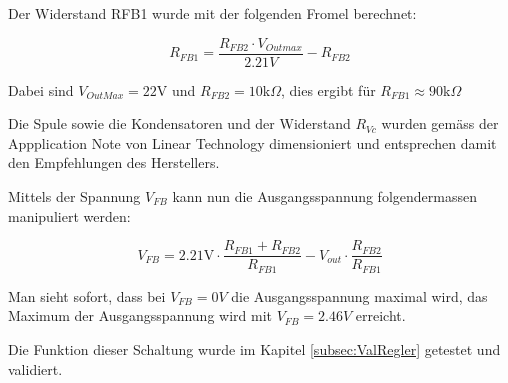 Der Widerstand RFB1 wurde mit der folgenden Fromel berechnet: 

\[
R_{FB1}=\frac{R_{FB2}\cdot V_{Outmax}}{2.21V}-R_{FB2}
\]

Dabei sind $V_{OutMax} =22$V und $R_{FB2} =10$k$\Omega$, dies ergibt für $R_{FB1} \approx 90$k$\Omega$

Die Spule sowie die Kondensatoren und der Widerstand $R_{Vc}$ wurden gemäss der Appplication Note  von Linear Technology dimensioniert und entsprechen damit den Empfehlungen des Herstellers.

Mittels der Spannung $V_{FB}$ kann nun die Ausgangsspannung folgendermassen manipuliert werden:

\[
V_{FB}=2.21\text{V}\cdot\frac{R_{FB1}+R_{FB2}}{R_{FB1}}-V_{out}\cdot\frac{R_{FB2}}{R_{FB1}}
\]

Man sieht sofort, dass bei $V_{FB}=0V$ die Ausgangsspannung maximal wird, das Maximum der Ausgangsspannung wird mit $V_{FB}=2.46V$  erreicht. 

Die Funktion dieser Schaltung wurde im Kapitel \ref{subsec:ValRegler} getestet und validiert.